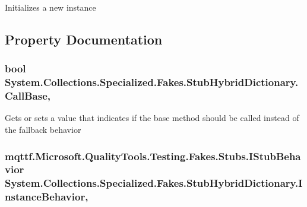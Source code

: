 Initializes a new instance



\subsection{Property Documentation}
\hypertarget{class_system_1_1_collections_1_1_specialized_1_1_fakes_1_1_stub_hybrid_dictionary_ae8c4dfd20bc839bd0db2feaf6df50273}{
\subsubsection[{Call\-Base}]{\setlength{\rightskip}{0pt plus 5cm}bool System.\-Collections.\-Specialized.\-Fakes.\-Stub\-Hybrid\-Dictionary.\-Call\-Base\hspace{0.3cm}{\ttfamily [get]}, {\ttfamily [set]}}}\label{class_system_1_1_collections_1_1_specialized_1_1_fakes_1_1_stub_hybrid_dictionary_ae8c4dfd20bc839bd0db2feaf6df50273}


Gets or sets a value that indicates if the base method should be called instead of the fallback behavior

\hypertarget{class_system_1_1_collections_1_1_specialized_1_1_fakes_1_1_stub_hybrid_dictionary_a2c1d874d246664b8f20e7364683d37e9}{
\subsubsection[{Instance\-Behavior}]{\setlength{\rightskip}{0pt plus 5cm}mqttf.\-Microsoft.\-Quality\-Tools.\-Testing.\-Fakes.\-Stubs.\-I\-Stub\-Behavior System.\-Collections.\-Specialized.\-Fakes.\-Stub\-Hybrid\-Dictionary.\-Instance\-Behavior\hspace{0.3cm}{\ttfamily [get]}, {\ttfamily [set]}}}\label{class_system_1_1_collections_1_1_specialized_1_1_fakes_1_1_stub_hybrid_dictionary_a2c1d874d246664b8f20e7364683d37e9}


